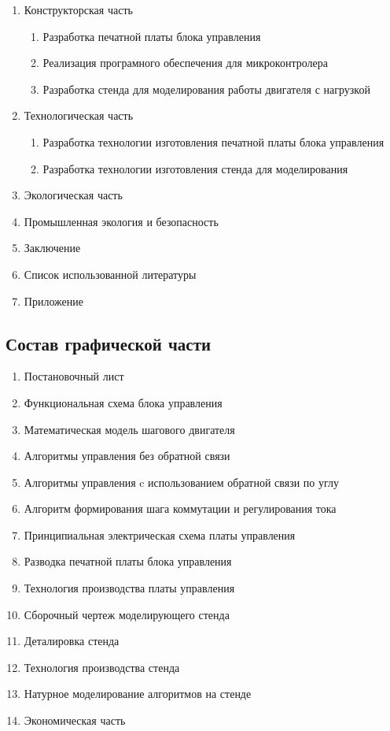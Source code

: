 \begin{enumerate}
\begin{enumerate}
        \end{enumerate}
    \item Конструкторская часть
        \begin{enumerate}
            \item Разработка печатной платы блока управления
            \item Реализация програмного обеспечения для микроконтролера
            \item Разработка стенда для моделирования работы двигателя с нагрузкой
        \end{enumerate}
    \item{Технологическая часть}
        \begin{enumerate}
            \item Разработка технологии изготовления печатной платы блока управления
            \item Разработка технологии изготовления стенда для моделирования
        \end{enumerate}
    \item{Экологическая часть}
    \item{Промышленная экология и безопасность}
    \item{Заключение}
    \item{Список использованной литературы}
    \item{Приложение}
\end{enumerate}

\newpage
\subsection{Состав графической части}
\begin{enumerate}
    \item Постановочный лист
    \item Функциональная схема блока управления
    \item Математическая модель шагового двигателя
    \item Алгоритмы управления без обратной связи
    \item Алгоритмы управления c использованием обратной связи по углу
    \item Алгоритм формирования шага коммутации и регулирования тока
    \item Принципиальная электрическая схема платы управления
    \item Разводка печатной платы блока управления
    \item Технология производства платы управления
    \item Сборочный чертеж моделирующего стенда
    \item Деталировка стенда
    \item Технология производства стенда
    \item Натурное моделирование алгоритмов на стенде
    \item Экономическая часть
\end{enumerate}

